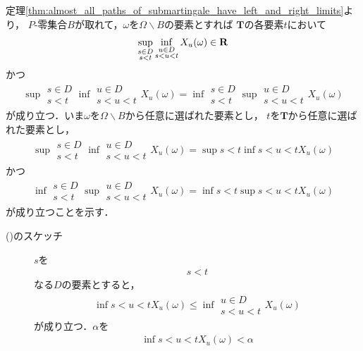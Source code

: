 	\begin{sketch}
		定理\ref{thm:almost_all_paths_of_submartingale_have_left_and_right_limits}より，
		$P$-零集合$B$が取れて，$\omega$を$\Omega \backslash B$の要素とすれば
		$\mathbf{T}$の各要素$t$において
		\begin{align}
			\operatorname*{sup}_{\substack{s \in D \\ s < t}} \operatorname*{inf}_{\substack{u \in D \\ s < u < t}} X_u(\omega) \in \mathbf{R}
		\end{align}
		かつ
		\begin{align}
			\sup{\substack{s \in D \\ s < t}}{\inf{\substack{u \in D \\ s < u < t}}{X_u(\omega)}} 
			= \inf{\substack{s \in D \\ s < t}}{\sup{\substack{u \in D \\ s < u < t}}{X_u(\omega)}}
		\end{align}
		が成り立つ．いま$\omega$を$\Omega \backslash B$から任意に選ばれた要素とし，
		$t$を$\mathbf{T}$から任意に選ばれた要素とし，
		\begin{align}
			\sup{\substack{s \in D \\ s < t}}{\inf{\substack{u \in D \\ s < u < t}}{X_u(\omega)}}
			= \sup{s < t}{\inf{s < u < t}{X_u(\omega)}}
			\label{fom:thm_regularity_of_paths_of_sub_martingales_1}
		\end{align}
		かつ
		\begin{align}
			\inf{\substack{s \in D \\ s < t}}{\sup{\substack{u \in D \\ s < u < t}}{X_u(\omega)}}
			= \inf{s < t}{\sup{s < u < t}{X_u(\omega)}}
			\label{fom:thm_regularity_of_paths_of_sub_martingales_2}
		\end{align}
		が成り立つことを示す．
		\begin{description}
			\item[()のスケッチ]
				$s$を
				\begin{align}
					s < t
				\end{align}
				なる$D$の要素とすると，
				\begin{align}
					\inf{s < u < t}{X_u(\omega)} \leq \inf{\substack{u \in D \\ s < u < t}}{X_u(\omega)}
				\end{align}
				が成り立つ．$\alpha$を
				\begin{align}
					\inf{s < u < t}{X_u(\omega)} < \alpha

\end{align}
\end{description}
\end{sketch}
